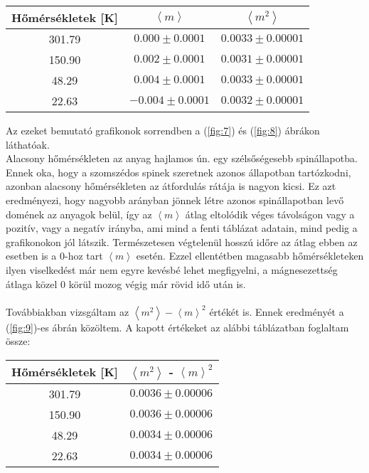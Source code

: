 \begin{center}
\begin{tabular}{c||c|c}
    \hline
    Hőmérsékletek [K] & $\left< m \right>$  & $\left< m^{2} \right>$ \\ \hline\hline
    301.79            & $0.000 \pm 0.0001$  & $0.0033 \pm 0.00001$   \\ \hline
    150.90            & $0.002 \pm 0.0001$  & $0.0031 \pm 0.00001$   \\ \hline
    48.29             & $0.004 \pm 0.0001$  & $0.0033 \pm 0.00001$   \\ \hline
    22.63             & $-0.004 \pm 0.0001$ & $0.0032 \pm 0.00001$   \\ \hline
\end{tabular}
\end{center}
\label{tab:1}
\hfill \break
Az ezeket bemutató grafikonok sorrendben a (\ref{fig:7}) és (\ref{fig:8}) ábrákon láthatóak. \\
Alacsony hőmérsékleten az anyag hajlamos ún.  egy szélsőségesebb spinállapotba. Ennek oka, hogy a szomszédos spinek szeretnek azonos állapotban tartózkodni, azonban alacsony hőmérsékleten az átfordulás rátája is nagyon kicsi. Ez azt eredményezi, hogy nagyobb arányban jönnek létre azonos spinállapotban levő domének az anyagok belül, így az $\left< m \right>$ átlag eltolódik véges távolságon vagy a pozitív, vagy a negatív irányba, ami mind a fenti táblázat adatain, mind pedig a grafikonokon jól látszik. Természetesen végtelenül hosszú időre az átlag ebben az esetben is a $0$-hoz tart $\left< m \right>$ esetén. Ezzel ellentétben magasabb hőmérsékleteken ilyen viselkedést már nem egyre kevésbé lehet megfigyelni, a mágnesezettség átlaga közel $0$ körül mozog végig már rövid idő után is.
\\ \\
Továbbiakban vizsgáltam az $\left< m^{2} \right> - \left< m \right>^{2}$ értékét is. Ennek eredményét a (\ref{fig:9})-es ábrán közöltem. A kapott értékeket az alábbi táblázatban foglaltam össze:
\begin{center}
\begin{tabular}{c||c}
    \hline
    Hőmérsékletek [K] & $\left< m^{2} \right>$ - $\left< m \right>^{2}$ \\ \hline\hline
    301.79            & $0.0036 \pm 0.00006$                            \\ \hline
    150.90            & $0.0036 \pm 0.00006$                            \\ \hline
    48.29             & $0.0034 \pm 0.00006$                            \\ \hline
    22.63             & $0.0034 \pm 0.00006$                            \\ \hline
\end{tabular}
\end{center}
\label{tab:1}
\hfill \break

